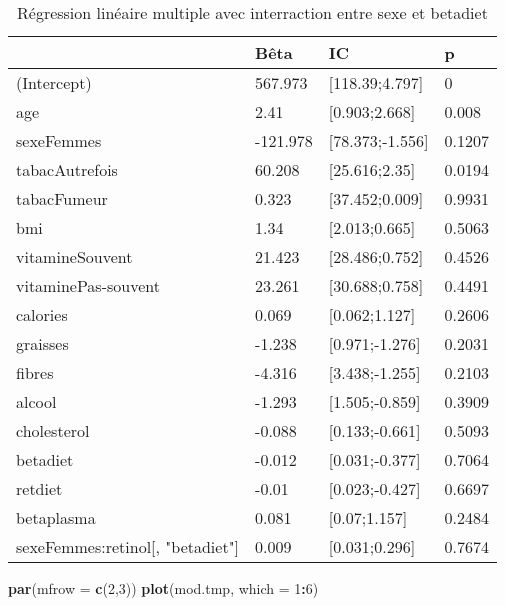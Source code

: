 \documentclass[]{article}
\newenvironment{Shaded}{\begin{snugshade}}{\end{snugshade}}
\newcommand{\KeywordTok}[1]{\textcolor[rgb]{0.13,0.29,0.53}{\textbf{#1}}}
\newcommand{\DataTypeTok}[1]{\textcolor[rgb]{0.13,0.29,0.53}{#1}}
\newcommand{\DecValTok}[1]{\textcolor[rgb]{0.00,0.00,0.81}{#1}}
\newcommand{\OperatorTok}[1]{\textcolor[rgb]{0.81,0.36,0.00}{\textbf{#1}}}
\newcommand{\NormalTok}[1]{#1}
\begin{document}
\begin{table}

\caption{\label{tab:unnamed-chunk-68}Régression linéaire multiple avec interraction entre sexe et betadiet}
\centering
\begin{tabular}[t]{l|l|l|l}
\hline
  & Bêta & IC & p\\
\hline
\rowcolor[HTML]{BBD2E1}  (Intercept) & 567.973 & [118.39;4.797] & 0\\
\hline
age & 2.41 & [0.903;2.668] & 0.008\\
\hline
\rowcolor[HTML]{BBD2E1}  sexeFemmes & -121.978 & [78.373;-1.556] & 0.1207\\
\hline
tabacAutrefois & 60.208 & [25.616;2.35] & 0.0194\\
\hline
\rowcolor[HTML]{BBD2E1}  tabacFumeur & 0.323 & [37.452;0.009] & 0.9931\\
\hline
bmi & 1.34 & [2.013;0.665] & 0.5063\\
\hline
\rowcolor[HTML]{BBD2E1}  vitamineSouvent & 21.423 & [28.486;0.752] & 0.4526\\
\hline
vitaminePas-souvent & 23.261 & [30.688;0.758] & 0.4491\\
\hline
\rowcolor[HTML]{BBD2E1}  calories & 0.069 & [0.062;1.127] & 0.2606\\
\hline
graisses & -1.238 & [0.971;-1.276] & 0.2031\\
\hline
\rowcolor[HTML]{BBD2E1}  fibres & -4.316 & [3.438;-1.255] & 0.2103\\
\hline
alcool & -1.293 & [1.505;-0.859] & 0.3909\\
\hline
\rowcolor[HTML]{BBD2E1}  cholesterol & -0.088 & [0.133;-0.661] & 0.5093\\
\hline
betadiet & -0.012 & [0.031;-0.377] & 0.7064\\
\hline
\rowcolor[HTML]{BBD2E1}  retdiet & -0.01 & [0.023;-0.427] & 0.6697\\
\hline
betaplasma & 0.081 & [0.07;1.157] & 0.2484\\
\hline
\rowcolor[HTML]{BBD2E1}  sexeFemmes:retinol[, "betadiet"] & 0.009 & [0.031;0.296] & 0.7674\\
\hline
\end{tabular}
\end{table}

\begin{Shaded}
\begin{Highlighting}[]
\KeywordTok{par}\NormalTok{(}\DataTypeTok{mfrow =} \KeywordTok{c}\NormalTok{(}\DecValTok{2}\NormalTok{,}\DecValTok{3}\NormalTok{))}
\KeywordTok{plot}\NormalTok{(mod.tmp, }\DataTypeTok{which =} \DecValTok{1}\OperatorTok{:}\DecValTok{6}\NormalTok{)}
\end{Highlighting}
\end{Shaded}
\end{document}
